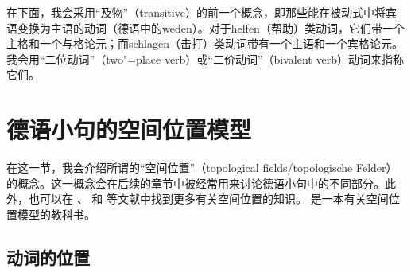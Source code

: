 在下面，我会采用“及物”（transitive）的前一个概念，即那些能在被动式中将宾语变换为主语的动词（\egc 德语中的weden）。对于helfen（帮助）类动词，它们带一个主格和一个与格论元；而schlagen（击打）类动词带有一个主语和一个宾格论元。我会用“二位动词”（two"=place verb）或“二价动词”（bivalent verb）动词来指称它们。

\section{德语小句的空间位置模型}
\label{sec-topo}
\label{Abschnitt-Toplogie}

%
在这一节，我会介绍所谓的“空间位置”（topological fields/topologische Felder）的概念。这一概念会在后续的章节中被经常用来讨论德语小句中的不同部分。此外，也可以在  、 和 等文献中找到更多有关空间位置的知识。 是一本有关空间位置模型的教科书。

\subsection{动词的位置}

